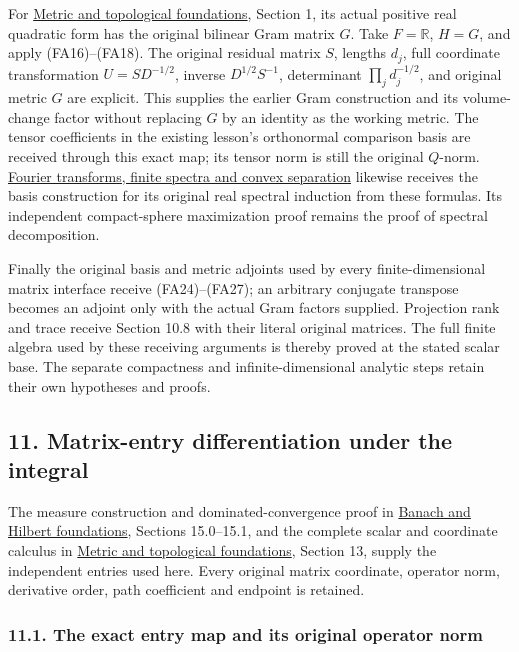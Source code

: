 \documentclass[
  11pt,
]{article}
\begin{document}
For \href{metric-foundation-bridges.pdf}{Metric and topological
foundations}, Section 1, its actual positive real quadratic form has the
original bilinear Gram matrix \(G\). Take \(F=\mathbb R\), \(H=G\), and
apply (FA16)--(FA18). The original residual matrix \(S\), lengths
\(d_j\), full coordinate transformation \(U=S D^{-1/2}\), inverse
\(D^{1/2}S^{-1}\), determinant \(\prod_jd_j^{-1/2}\), and original
metric \(G\) are explicit. This supplies the earlier Gram construction
and its volume-change factor without replacing \(G\) by an identity as
the working metric. The tensor coefficients in the existing lesson's
orthonormal comparison basis are received through this exact map; its
tensor norm is still the original \(Q\)-norm.
\href{prerequisite-bridges.pdf}{Fourier transforms, finite spectra and
convex separation} likewise receives the basis construction for its
original real spectral induction from these formulas. Its independent
compact-sphere maximization proof remains the proof of spectral
decomposition.

Finally the original basis and metric adjoints used by every
finite-dimensional matrix interface receive (FA24)--(FA27); an arbitrary
conjugate transpose becomes an adjoint only with the actual Gram factors
supplied. Projection rank and trace receive Section 10.8 with their
literal original matrices. The full finite algebra used by these
receiving arguments is thereby proved at the stated scalar base. The
separate compactness and infinite-dimensional analytic steps retain
their own hypotheses and proofs.

\subsection{11. Matrix-entry differentiation under the
integral}\label{matrix-entry-differentiation-under-the-integral}

The measure construction and dominated-convergence proof in
\href{banach-foundation-bridges.pdf}{Banach and Hilbert foundations},
Sections 15.0--15.1, and the complete scalar and coordinate calculus in
\href{metric-foundation-bridges.pdf}{Metric and topological foundations},
Section 13, supply the independent entries used here. Every original
matrix coordinate, operator norm, derivative order, path coefficient and
endpoint is retained.

\subsubsection{11.1. The exact entry map and its original operator
norm}\label{the-exact-entry-map-and-its-original-operator-norm}
\end{document}
